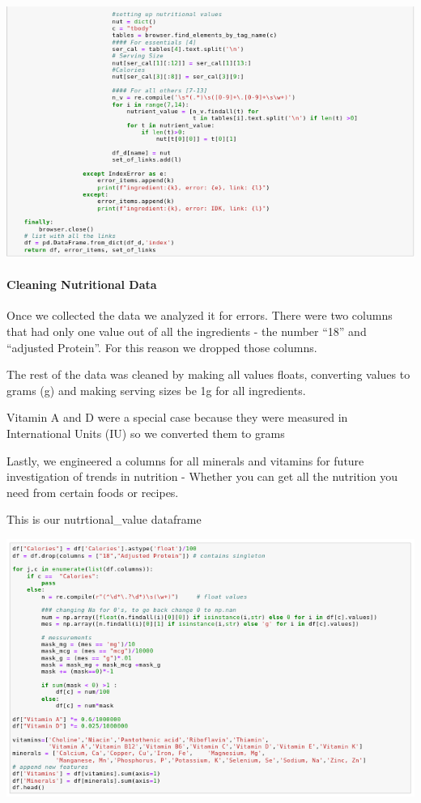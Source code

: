 \documentclass[11pt]{article}
\makeatletter
\def\maxwidth{\ifdim\Gin@nat@width>\linewidth\linewidth
    \else\Gin@nat@width\fi}
\let\Oldincludegraphics\includegraphics
\renewcommand{\includegraphics}[1]{\Oldincludegraphics[width=.8\maxwidth]{#1}}
\makeatother
\begin{document}
    \includegraphics{split6.png}

    \hypertarget{cleaning-nutritional-data}{%
\paragraph{Cleaning Nutritional Data}\label{cleaning-nutritional-data}}

Once we collected the data we analyzed it for errors. There were two
columns that had only one value out of all the ingredients - the number
``18'' and ``adjusted Protein''. For this reason we dropped those
columns.

The rest of the data was cleaned by making all values floats, converting
values to grams (g) and making serving sizes be 1g for all ingredients.

Vitamin A and D were a special case because they were measured in
International Units (IU) so we converted them to grams

Lastly, we engineered a columns for all minerals and vitamins for future
investigation of trends in nutrition - Whether you can get all the
nutrition you need from certain foods or recipes.

This is our nutrtional\_value dataframe

\includegraphics{isaac_code4.png}
\end{document}
